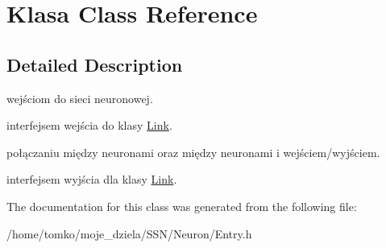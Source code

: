 \hypertarget{class_klasa}{\section{\-Klasa \-Class \-Reference}
\label{class_klasa}
}


\subsection{\-Detailed \-Description}
wejściom do sieci neuronowej.

interfejsem wejścia do klasy \hyperlink{class_link}{\-Link}.

połączaniu między neuronami oraz między neuronami i wejściem/wyjściem.

interfejsem wyjścia dla klasy \hyperlink{class_link}{\-Link}. 

\-The documentation for this class was generated from the following file\-:\begin{DoxyCompactItemize}
\item 
/home/tomko/moje\-\_\-dziela/\-S\-S\-N/\-Neuron/\-Entry.\-h\end{DoxyCompactItemize}
